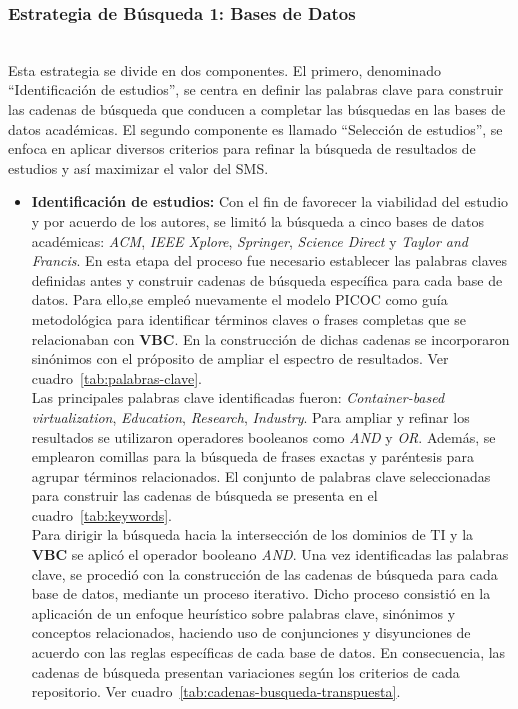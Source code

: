 \subsubsection{Estrategia de Búsqueda 1: Bases de Datos}
\mbox{}\\
Esta estrategia se divide en dos componentes. El primero, denominado ``Identificación de estudios'', se centra en definir las palabras clave para construir las cadenas de búsqueda que conducen a completar las búsquedas en las bases de datos académicas.
El segundo componente es llamado ``Selección de estudios'', se enfoca en aplicar diversos criterios para refinar la búsqueda de resultados de estudios y así maximizar el valor del SMS.

\begin{itemize}
    \item \textbf{Identificación de estudios: } Con el fin de favorecer la viabilidad del estudio y por acuerdo de los autores, se limitó la búsqueda a cinco bases de datos académicas: \textit{ACM}, \textit{IEEE Xplore}, \textit{Springer}, \textit{Science Direct} y \textit{Taylor and Francis}. En esta etapa del proceso fue necesario establecer las palabras claves definidas antes y construir cadenas de búsqueda específica para cada base de datos. Para ello,se empleó nuevamente el modelo PICOC como guía metodológica para identificar términos claves o frases completas que se relacionaban con \textbf{VBC}. En la construcción de dichas cadenas se incorporaron sinónimos con el próposito de ampliar el espectro de resultados. Ver cuadro~\ref{tab:palabras-clave}.\\
    Las principales palabras clave identificadas fueron: \textit{Container-based virtualization}, \textit{Education}, \textit{Research}, \textit{Industry}. Para ampliar y refinar los resultados se utilizaron operadores booleanos como \textit{AND} y \textit{OR}. Además, se emplearon comillas para la búsqueda de frases exactas y paréntesis para agrupar términos relacionados. El conjunto de palabras clave seleccionadas para construir las cadenas de búsqueda se presenta en el cuadro~\ref{tab:keywords}.\\
    Para dirigir la búsqueda hacia la intersección de los dominios de TI y la \textbf{VBC} se aplicó el operador booleano \textit{AND}. Una vez identificadas las palabras clave, se procedió con la construcción de las cadenas de búsqueda para cada base de datos, mediante un proceso iterativo. Dicho proceso consistió en la aplicación de un enfoque heurístico sobre palabras clave, sinónimos y conceptos relacionados, haciendo uso de conjunciones y disyunciones de acuerdo con las reglas específicas de cada base de datos. En consecuencia, las cadenas de búsqueda presentan variaciones según los criterios de cada repositorio. Ver cuadro~\ref{tab:cadenas-busqueda-transpuesta}.\\


\end{itemize}
